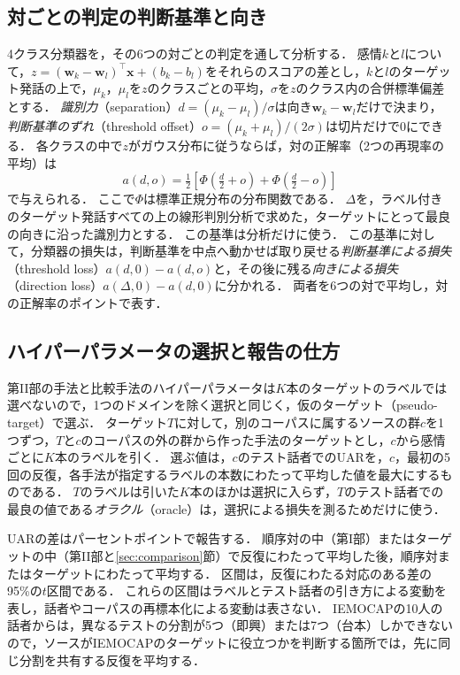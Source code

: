 \subsection{対ごとの判定の判断基準と向き}
\label{sec:setting-model}

4クラス分類器を，その6つの対ごとの判定を通して分析する．
感情$k$と$l$について，$z = (\mathbf{w}_k - \mathbf{w}_l)^{\top}\mathbf{x} + (b_k - b_l)$をそれらのスコアの差とし，$k$と$l$のターゲット発話の上で，$\mu_k$，$\mu_l$を$z$のクラスごとの平均，$\sigma$を$z$のクラス内の合併標準偏差とする．
\emph{識別力}（separation）$d = (\mu_k - \mu_l)/\sigma$は向き$\mathbf{w}_k - \mathbf{w}_l$だけで決まり，\emph{判断基準のずれ}（threshold offset）$o = (\mu_k + \mu_l)/(2\sigma)$は切片だけで0にできる．
各クラスの中で$z$がガウス分布に従うならば，対の正解率（2つの再現率の平均）は
\begin{equation}
\label{eq:twocloud}
a(d, o) = \tfrac{1}{2}\left[\Phi\!\left(\tfrac{d}{2} + o\right) + \Phi\!\left(\tfrac{d}{2} - o\right)\right]
\end{equation}
で与えられる．
ここで$\Phi$は標準正規分布の分布関数である．
$\Delta$を，ラベル付きのターゲット発話すべての上の線形判別分析で求めた，ターゲットにとって最良の向きに沿った識別力とする．
この基準は分析だけに使う．
この基準に対して，分類器の損失は，判断基準を中点へ動かせば取り戻せる\emph{判断基準による損失}（threshold loss）$a(d, 0) - a(d, o)$と，その後に残る\emph{向きによる損失}（direction loss）$a(\Delta, 0) - a(d, 0)$に分かれる．
両者を6つの対で平均し，対の正解率のポイントで表す．

\subsection{ハイパーパラメータの選択と報告の仕方}
\label{sec:setting-selection}

第II部の手法と比較手法のハイパーパラメータは$K$本のターゲットのラベルでは選べないので，1つのドメインを除く選択\cite{gulrajani2021domainbed}と同じく，仮のターゲット（pseudo-target）で選ぶ．
ターゲット$T$に対して，別のコーパスに属するソースの群$c$を1つずつ，$T$と$c$のコーパスの外の群から作った手法のターゲットとし，$c$から感情ごとに$K$本のラベルを引く．
選ぶ値は，$c$のテスト話者でのUARを，$c$，最初の5回の反復，各手法が指定するラベルの本数にわたって平均した値を最大にするものである．
$T$のラベルは引いた$K$本のほかは選択に入らず，$T$のテスト話者での最良の値である\emph{オラクル}（oracle）は，選択による損失を測るためだけに使う．

UARの差はパーセントポイントで報告する．
順序対の中（第I部）またはターゲットの中（第II部と\ref{sec:comparison}節）で反復にわたって平均した後，順序対またはターゲットにわたって平均する．
区間は，反復にわたる対応のある差の95\%の$t$区間である．
これらの区間はラベルとテスト話者の引き方による変動を表し，話者やコーパスの再標本化による変動は表さない．
IEMOCAPの10人の話者からは，異なるテストの分割が5つ（即興）または7つ（台本）しかできないので，ソースがIEMOCAPのターゲットに役立つかを判断する箇所では，先に同じ分割を共有する反復を平均する．
